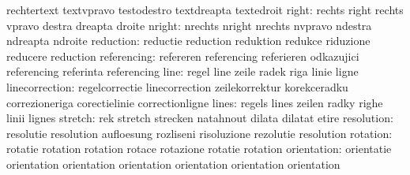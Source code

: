                            rechtertext               textvpravo
                           testodestro               textdreapta
                           textedroit
                    right: rechts                    right
                           rechts                    vpravo
                           destra                    dreapta
                           droite
                   nright: nrechts                   nright
                           nrechts                   nvpravo
                           ndestra                   ndreapta
                           ndroite
                reduction: reductie                  reduction
                           reduktion                 redukce
                           riduzione                 reducere
                           reduction
              referencing: refereren                 referencing
                           referieren                odkazujici
                           referencing               referinta
                           referencing
                     line: regel                     line
                           zeile                     radek
                           riga                      linie
                           ligne
           linecorrection: regelcorrectie            linecorrection
                           zeilekorrektur            korekceradku
                           correzioneriga            corectielinie
                           correctionligne
                    lines: regels                    lines
                           zeilen                    radky
                           righe                     linii
                           lignes
                  stretch: rek                       stretch
                           strecken                  natahnout
                           dilata                    dilatat
                           etire
               resolution: resolutie                 resolution
                           aufloesung                rozliseni
                           risoluzione               rezolutie
                           resolution
                 rotation: rotatie                   rotation
                           rotation                  rotace
                           rotazione                 rotatie
                           rotation
              orientation: orientatie                orientation
                           orientation               orientation
                           orientation               orientation
                           orientation
